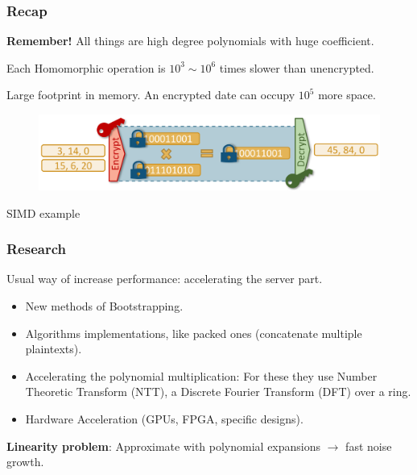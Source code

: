 \documentclass[10pt,handout]{beamer}
\begin{document}

\begin{frame}
\frametitle{Recap}

    \textbf{Remember!} All things are high degree polynomials with huge coefficient.


Each Homomorphic operation is $10^3 \sim 10^6$ times slower than unencrypted.
\pause

Large footprint in memory.
An encrypted date can occupy $10^5$ more space.

\pause

        \begin{figure}[h!]
            \centering
            \includegraphics[scale=0.8]{workflow.png}
        \end{figure}
    \centering
        SIMD example


\end{frame}


\begin{frame}
\frametitle{Research}

    Usual way of increase performance:  accelerating the server part.
\pause
\begin{itemize}\itemsep-0.7em
   \item New methods of Bootstrapping.
   \item Algorithms implementations, like packed ones (concatenate multiple plaintexts).
       \pause
   \item Accelerating the polynomial multiplication:
       For these they use Number Theoretic Transform (NTT), a Discrete Fourier Transform (DFT) over a ring.
   \item Hardware Acceleration (GPUs, FPGA, specific designs).
\end{itemize}
\pause

    \textbf{Linearity problem}: Approximate with polynomial expansions $\rightarrow$ fast noise growth.
\end{frame}
\end{document}
